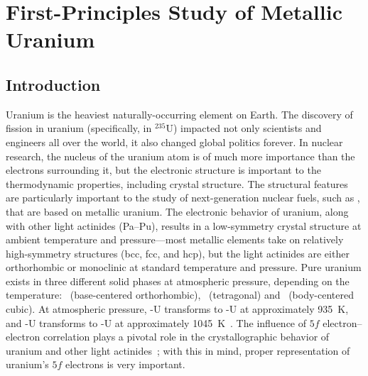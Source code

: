 \chapter{First-Principles Study of Metallic Uranium}


\section{Introduction}\label{sec_intro}
Uranium is the heaviest naturally-occurring element on Earth. The discovery of
fission in uranium (specifically, in $^{235}$U) impacted not only scientists
and engineers all over the world, it also changed global politics forever. In
nuclear research, the nucleus of the uranium atom is of much more importance
than the electrons surrounding it, but the electronic structure is important
to the thermodynamic properties, including crystal structure. The structural
features are particularly important to the study of next-generation nuclear
fuels, such as , that are based on metallic uranium.
The electronic behavior of uranium, along with other light actinides (Pa--Pu),
results in a low-symmetry crystal structure at ambient temperature and
pressure---most metallic elements take on relatively high-symmetry structures
(bcc, fcc, and hcp), but the light actinides are either orthorhombic or
monoclinic at standard temperature and pressure.
Pure uranium exists in three different solid phases at atmospheric pressure,
depending on the temperature:
\textalpha\ (base-centered orthorhombic), \textbeta\ (tetragonal) and
\textgamma\ (body-centered cubic). At atmospheric pressure, \textalpha-U
transforms to \textbeta-U at approximately 935~K, and \textbeta-U transforms to
\textgamma-U at approximately
1045~K~\cite{lawson1988structure,akella1997structural}.
The influence of $5f$
electron--electron correlation plays a pivotal role in the crystallographic
behavior of uranium and other light
actinides~\cite{lander2003gh,freemanHandbook1984}; with this in mind, proper
representation of uranium's $5f$ electrons is very important.

